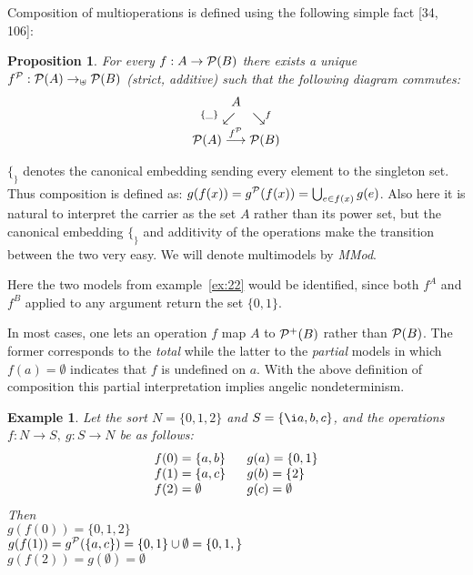 \documentclass[10pt]{article}
\newcommand{\PSet}{{\cal P}}
\newcommand{\into}{\mathrel{\rightarrow}}
\newcommand{\addstrinto}{\mathrel{\rightarrow_{\uplus}}}
\newcommand{\es}{\emptyset}
\newcounter{CLAIM}[section]
\newtheorem{Claim}[CLAIM]{Proposition}
\newtheorem{Example}[CLAIM]{Example}
\begin{document}
Composition of multioperations is defined 
using the following simple fact [34, 106]:
\begin{Claim}\label{prop:24} %
For every $f:A\into\PSet(B)$ there exists a unique 
$f^{\PSet}:\PSet(A)\addstrinto\PSet(B)$ (strict, additive) such that 
the following diagram commutes:
\[ \begin{array}{c}
 A \\
 ^{\{\_\}}\swarrow\ \ \ \ \searrow^{f} \\
 \PSet(A) \stackrel{f^{\PSet}}\longrightarrow \PSet(B)
 \end{array} 
 \]
 \end{Claim} 
 $\{_\}$ denotes the canonical embedding sending 
every element to the singleton set. Thus composition is defined as: 
$g(f(x)) = g^{\PSet}(f(x)) = \bigcup_{e\in f(x)}g(e)$. 
Also here it is natural to interpret the carrier as the set 
$A$ rather than its power set, but the canonical embedding $\{_\}$ and 
additivity of the operations make the transition between the two very 
easy. We will denote multimodels by {\em MMod}.

Here the two models from example~\ref{ex:22}
would be identified, since both $f^{A}$ and $f^{B}$
applied to any argument return the set $\{0,1\}$. 

In most cases, one lets an operation $f$ 
map $A$ to $\PSet^{+}(B)$ rather than $\PSet(B)$. The former 
corresponds to the {\em total} while the latter to the {\em partial} 
models in which $f(a)=\es$ indicates that $f$ is undefined on $a$. 
With the above definition of 
composition this partial interpretation implies angelic 
nondeterminism.

\begin{Example}\label{ex:25} %
Let the sort $N = \{0,1,2\}$ and $S=\{{\i a,b,c}\}$, and the operations 
$f:N\into S,\ g:S\into N$  be as follows:
\[ \begin{array}{l@{\  \ \ \ \ }l}
f(0) = \{a,b\} & g(a) = \{0,1\} \\ 
f(1) = \{a,c\} & g(b) = \{2\} \\ 
f(2) = \es  & g(c) = \es \end{array}
\]
Then \\
\hspace*{2em}$ g(f(0)) = \{0,1,2\} $ \\
\hspace*{2em}$ g(f(1)) = g^{\PSet}(\{a,c\}) = \{0,1\}\cup \es = \{0,1,\} $ \\
\hspace*{2em}$ g(f(2)) = g(\es) = \es $ 
\end{Example}
\end{document}
